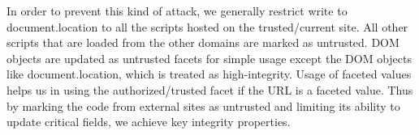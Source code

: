 In order to prevent this kind of attack, we generally restrict write to document.location to all the scripts hosted on the trusted/current site. All other scripts that are loaded from the other domains are marked as untrusted. DOM objects are updated as untrusted facets for simple usage except the DOM objects like document.location, which is treated as high-integrity. Usage of faceted values helps us in using the authorized/trusted facet if the URL is a faceted value. Thus by marking the code from external sites as untrusted and limiting its ability to update critical fields, we achieve key integrity properties.

